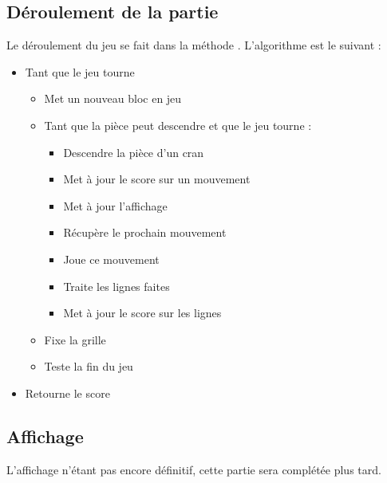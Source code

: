 \subsection{Déroulement de la partie}
Le déroulement du jeu se fait dans la méthode . L'algorithme est le suivant :
\begin{itemize}
	\item Tant que le jeu tourne 
	\begin{itemize}
		\item Met un nouveau bloc en jeu
		\item Tant que la pièce peut descendre et que le jeu tourne :
		\begin{itemize}
			\item Descendre la pièce d'un cran
			\item Met à jour le score sur un mouvement
			\item Met à jour l'affichage
			\item Récupère le prochain mouvement
			\item Joue ce mouvement
			\item Traite les lignes faites
			\item Met à jour le score sur les lignes
		\end{itemize}
		\item 	Fixe la grille
		\item Teste la fin du jeu
	\end{itemize}
	\item Retourne le score
\end{itemize}

\subsection{Affichage}
L'affichage n'étant pas encore définitif, cette partie sera complétée plus tard.
